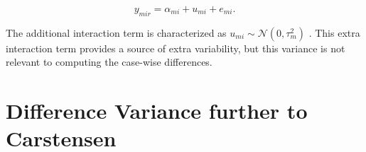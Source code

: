 \documentclass[12pt, a4paper]{report}
\theoremstyle{plain}
\theoremstyle{definition}
\theoremstyle{remark}
\begin{document}
\[ y_{mir} =  \alpha_{mi} + u_{mi} + e_{mi}.  \]

The additional interaction term is characterized as $u_{mi}  \sim \mathcal{N}(0, \tau^2_m)$ \citep{BXC2008}. This extra interaction term provides a source of extra variability, but this variance is not relevant to computing the case-wise differences.

%
%
%
%


%
%
























	\section{Difference Variance further to Carstensen}
	

\end{document}
